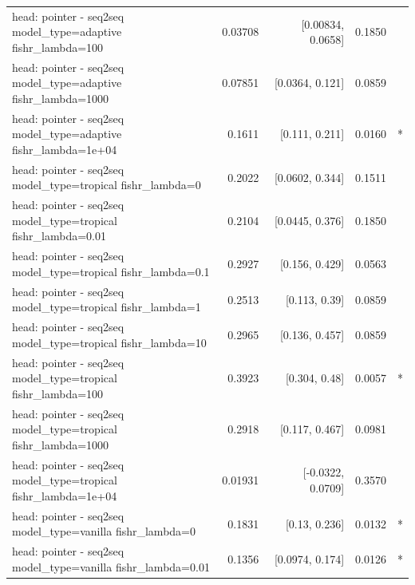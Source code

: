 \documentclass[10pt]{article}
\makeatletter
\newcommand{\stackcell}[1]{\begin{tabular}[t]{@{}l@{}}#1\end{tabular}}
\makeatother
\begin{document}
{\begin{longtable}{lrrrl}
\stackcell{head: pointer - seq2seq\\\footnotesize model\_type=adaptive fishr\_lambda=100 } & 0.03708 & [0.00834, 0.0658] & 0.1850 & \\
\stackcell{head: pointer - seq2seq\\\footnotesize model\_type=adaptive fishr\_lambda=1000 } & 0.07851 & [0.0364, 0.121] & 0.0859 & \\
\stackcell{head: pointer - seq2seq\\\footnotesize model\_type=adaptive fishr\_lambda=1e+04 } & 0.1611 & [0.111, 0.211] & 0.0160 & *\\
\stackcell{head: pointer - seq2seq\\\footnotesize model\_type=tropical fishr\_lambda=0 } & 0.2022 & [0.0602, 0.344] & 0.1511 & \\
\stackcell{head: pointer - seq2seq\\\footnotesize model\_type=tropical fishr\_lambda=0.01 } & 0.2104 & [0.0445, 0.376] & 0.1850 & \\
\stackcell{head: pointer - seq2seq\\\footnotesize model\_type=tropical fishr\_lambda=0.1 } & 0.2927 & [0.156, 0.429] & 0.0563 & \\
\stackcell{head: pointer - seq2seq\\\footnotesize model\_type=tropical fishr\_lambda=1 } & 0.2513 & [0.113, 0.39] & 0.0859 & \\
\stackcell{head: pointer - seq2seq\\\footnotesize model\_type=tropical fishr\_lambda=10 } & 0.2965 & [0.136, 0.457] & 0.0859 & \\
\stackcell{head: pointer - seq2seq\\\footnotesize model\_type=tropical fishr\_lambda=100 } & 0.3923 & [0.304, 0.48] & 0.0057 & *\\
\stackcell{head: pointer - seq2seq\\\footnotesize model\_type=tropical fishr\_lambda=1000 } & 0.2918 & [0.117, 0.467] & 0.0981 & \\
\stackcell{head: pointer - seq2seq\\\footnotesize model\_type=tropical fishr\_lambda=1e+04 } & 0.01931 & [-0.0322, 0.0709] & 0.3570 & \\
\stackcell{head: pointer - seq2seq\\\footnotesize model\_type=vanilla fishr\_lambda=0 } & 0.1831 & [0.13, 0.236] & 0.0132 & *\\
\stackcell{head: pointer - seq2seq\\\footnotesize model\_type=vanilla fishr\_lambda=0.01 } & 0.1356 & [0.0974, 0.174] & 0.0126 & *\\

\end{longtable}}
\end{document}
